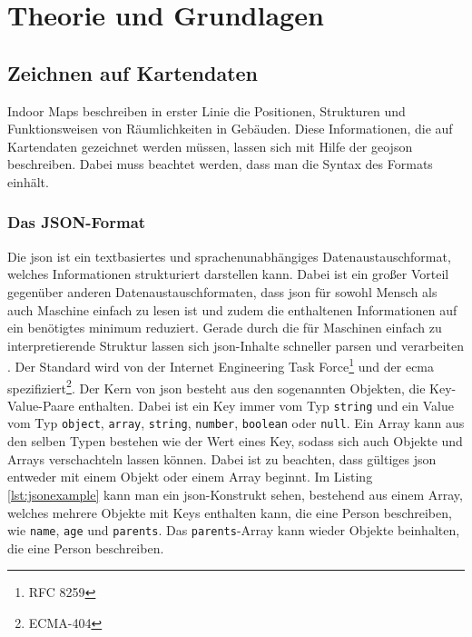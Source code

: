 \chapter{Theorie und Grundlagen}

\section{Zeichnen auf Kartendaten}
Indoor Maps beschreiben in erster Linie die Positionen, Strukturen und Funktionsweisen von Räumlichkeiten in Gebäuden. Diese Informationen, die auf Kartendaten gezeichnet werden müssen, lassen sich mit Hilfe der \acs{geojson} beschreiben. Dabei muss beachtet werden, dass man die Syntax des Formats einhält.

\subsection{Das JSON-Format}
Die \ac{json} ist ein textbasiertes und sprachenunabhängiges Datenaustauschformat, welches Informationen strukturiert darstellen kann. Dabei ist ein großer Vorteil gegenüber anderen Datenaustauschformaten, dass \ac{json} für sowohl Mensch als auch Maschine einfach zu lesen ist und zudem die enthaltenen Informationen auf ein benötigtes minimum reduziert. Gerade durch die für Maschinen einfach zu interpretierende Struktur lassen sich \ac{json}-Inhalte schneller parsen und verarbeiten \parencite{WYS2014}. Der Standard wird von der Internet Engineering Task Force\footnote{RFC 8259} und der \ac{ecma} spezifiziert\footnote{ECMA-404}.\pbreak%
%
Der Kern von \ac{json} besteht aus den sogenannten Objekten, die Key-Value-Paare enthalten. Dabei ist ein Key immer vom Typ \texttt{string} und ein Value vom Typ \texttt{object}, \texttt{array}, \texttt{string}, \texttt{number}, \texttt{boolean} oder \texttt{null}. Ein Array kann aus den selben Typen bestehen wie der Wert eines Key, sodass sich auch Objekte und Arrays verschachteln lassen können. Dabei ist zu beachten, dass gültiges \ac{json} entweder mit einem Objekt oder einem Array beginnt. Im Listing \ref{lst:jsonexample} kann man ein \ac{json}-Konstrukt sehen, bestehend aus einem Array, welches mehrere Objekte mit Keys enthalten kann, die eine Person beschreiben, wie \texttt{name}, \texttt{age} und \texttt{parents}. %
Das \texttt{parents}-Array kann wieder Objekte beinhalten, die eine Person beschreiben.
%
%
